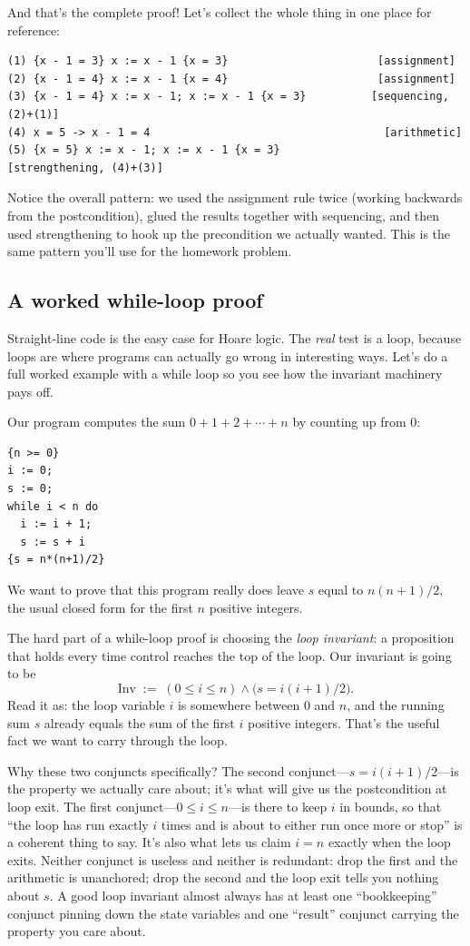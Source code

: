 \documentclass[11pt]{article}
\begin{document}
And that's the complete proof! Let's collect the whole thing in one place for reference:

\begin{lstlisting}
(1) {x - 1 = 3} x := x - 1 {x = 3}                       [assignment]
(2) {x - 1 = 4} x := x - 1 {x = 4}                       [assignment]
(3) {x - 1 = 4} x := x - 1; x := x - 1 {x = 3}          [sequencing, (2)+(1)]
(4) x = 5 -> x - 1 = 4                                    [arithmetic]
(5) {x = 5} x := x - 1; x := x - 1 {x = 3}              [strengthening, (4)+(3)]
\end{lstlisting}

Notice the overall pattern: we used the assignment rule twice (working backwards from the postcondition), glued the results together with sequencing, and then used strengthening to hook up the precondition we actually wanted. This is the same pattern you'll use for the homework problem.

\subsection{A worked while-loop proof}

Straight-line code is the easy case for Hoare logic. The \emph{real} test is a loop, because loops are where programs can actually go wrong in interesting ways. Let's do a full worked example with a while loop so you see how the invariant machinery pays off.

Our program computes the sum $0 + 1 + 2 + \cdots + n$ by counting up from 0:
\begin{lstlisting}
{n >= 0}
i := 0;
s := 0;
while i < n do
  i := i + 1;
  s := s + i
{s = n*(n+1)/2}
\end{lstlisting}
We want to prove that this program really does leave $s$ equal to $n(n+1)/2$, the usual closed form for the first $n$ positive integers.

The hard part of a while-loop proof is choosing the \emph{loop invariant}: a proposition that holds every time control reaches the top of the loop. Our invariant is going to be
\[
  \text{Inv} \;:=\; (0 \leq i \leq n) \wedge \bigl(s = i(i+1)/2\bigr).
\]
Read it as: the loop variable $i$ is somewhere between $0$ and $n$, and the running sum $s$ already equals the sum of the first $i$ positive integers. That's the useful fact we want to carry through the loop.

Why these two conjuncts specifically? The second conjunct---$s = i(i+1)/2$---is the property we actually care about; it's what will give us the postcondition at loop exit. The first conjunct---$0 \leq i \leq n$---is there to keep $i$ in bounds, so that ``the loop has run exactly $i$ times and is about to either run once more or stop'' is a coherent thing to say. It's also what lets us claim $i = n$ exactly when the loop exits. Neither conjunct is useless and neither is redundant: drop the first and the arithmetic is unanchored; drop the second and the loop exit tells you nothing about $s$. A good loop invariant almost always has at least one ``bookkeeping'' conjunct pinning down the state variables and one ``result'' conjunct carrying the property you care about.
\end{document}
